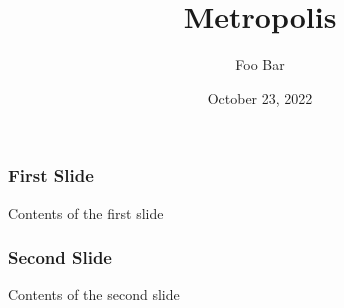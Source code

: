 \documentclass{beamer}
\title{Metropolis}
\author{Foo Bar}
\date{October 23, 2022}
\begin{document}
\maketitle
\begin{frame}
\frametitle{First Slide}
Contents of the first slide
\end{frame}
\begin{frame}
\frametitle{Second Slide}
Contents of the second slide
\end{frame}
\end{document}
